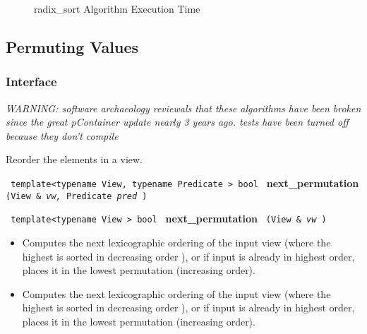 \begin{figure}[p]
\caption{radix\_sort Algorithm Execution Time}
\label{fig:radix-sort-alg-exec-exper}
\end{figure}


\subsection{Permuting Values} \label{sec-sort-permute}

\subsubsection{Interface} %


\textit{WARNING: software archaeology reviewals that these algorithms 
have been broken since the great pContainer update nearly 3 years ago.
tests have been turned off because they don't compile}

Reorder the elements in a view. 

\noindent
\texttt{%
template<typename View, typename Predicate >
\newline
bool 
}
\newline
\textbf{next\_permutation}%
\texttt{%
(View \&
\textit{vw,}%
Predicate 
\textit{pred}%
)
}
\vspace{0.4cm}

\noindent
\texttt{%
template<typename View >
\newline
bool 
}
\newline
\textbf{next\_permutation}%
\texttt{%
(View \&
\textit{vw}%
)
}

\begin{itemize}
\item
Computes the next lexicographic ordering of the input view (where the highest is sorted in decreasing order
), or if input is already in highest order, places it in the lowest permutation (increasing order). 
\item
Computes the next lexicographic ordering of the input view (where the highest is sorted in decreasing order
), or if input is already in highest order, places it in the lowest permutation (increasing order). 
\end{itemize}
 
